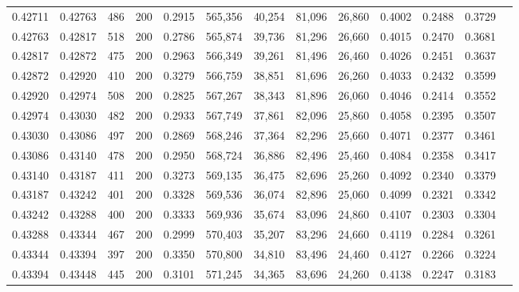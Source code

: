 \begin{tabular}{rrrrrrrrrrrrr}
0.42711 & 0.42763 &   486 & 200 &                                     0.2915 & 565,356 &  40,254 &  81,096 &  26,860 & 0.4002 & 0.2488 & 0.3729 \\
0.42763 & 0.42817 &   518 & 200 &                                     0.2786 & 565,874 &  39,736 &  81,296 &  26,660 & 0.4015 & 0.2470 & 0.3681 \\
0.42817 & 0.42872 &   475 & 200 &                                     0.2963 & 566,349 &  39,261 &  81,496 &  26,460 & 0.4026 & 0.2451 & 0.3637 \\
0.42872 & 0.42920 &   410 & 200 &                                     0.3279 & 566,759 &  38,851 &  81,696 &  26,260 & 0.4033 & 0.2432 & 0.3599 \\
0.42920 & 0.42974 &   508 & 200 &                                     0.2825 & 567,267 &  38,343 &  81,896 &  26,060 & 0.4046 & 0.2414 & 0.3552 \\
0.42974 & 0.43030 &   482 & 200 &                                     0.2933 & 567,749 &  37,861 &  82,096 &  25,860 & 0.4058 & 0.2395 & 0.3507 \\
0.43030 & 0.43086 &   497 & 200 &                                     0.2869 & 568,246 &  37,364 &  82,296 &  25,660 & 0.4071 & 0.2377 & 0.3461 \\
0.43086 & 0.43140 &   478 & 200 &                                     0.2950 & 568,724 &  36,886 &  82,496 &  25,460 & 0.4084 & 0.2358 & 0.3417 \\
0.43140 & 0.43187 &   411 & 200 &                                     0.3273 & 569,135 &  36,475 &  82,696 &  25,260 & 0.4092 & 0.2340 & 0.3379 \\
0.43187 & 0.43242 &   401 & 200 &                                     0.3328 & 569,536 &  36,074 &  82,896 &  25,060 & 0.4099 & 0.2321 & 0.3342 \\
0.43242 & 0.43288 &   400 & 200 &                                     0.3333 & 569,936 &  35,674 &  83,096 &  24,860 & 0.4107 & 0.2303 & 0.3304 \\
0.43288 & 0.43344 &   467 & 200 &                                     0.2999 & 570,403 &  35,207 &  83,296 &  24,660 & 0.4119 & 0.2284 & 0.3261 \\
0.43344 & 0.43394 &   397 & 200 &                                     0.3350 & 570,800 &  34,810 &  83,496 &  24,460 & 0.4127 & 0.2266 & 0.3224 \\
0.43394 & 0.43448 &   445 & 200 &                                     0.3101 & 571,245 &  34,365 &  83,696 &  24,260 & 0.4138 & 0.2247 & 0.3183 \\

\end{tabular}
